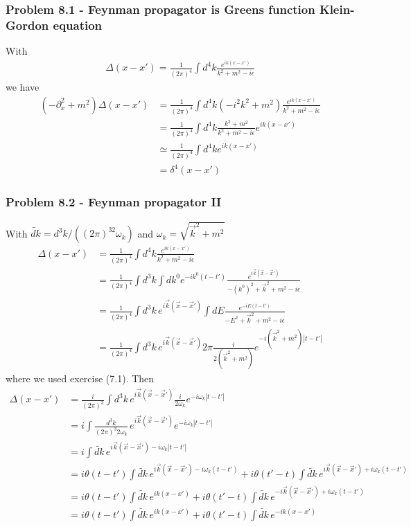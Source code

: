 \documentclass[10pt,a4paper]{book}
\theoremstyle{definition}
\begin{document}
\subsubsection{Problem 8.1 - Feynman propagator is Greens function Klein-Gordon equation}
With
\begin{align}
\Delta(x-x')=\frac{1}{(2\pi)^4}\int d^4k\frac{e^{ik(x-x')}}{k^2+m^2-i\epsilon}
\end{align}
we have
\begin{align}
(-\partial_x^2+m^2)\Delta(x-x')
&=\frac{1}{(2\pi)^4}\int d^4k(-i^2k^2+m^2)\frac{e^{ik(x-x')}}{k^2+m^2-i\epsilon}\\
&=\frac{1}{(2\pi)^4}\int d^4k\frac{k^2+m^2}{k^2+m^2-i\epsilon}e^{ik(x-x')}\\
&\simeq\frac{1}{(2\pi)^4}\int d^4ke^{ik(x-x')}\\
&=\delta^4(x-x')
\end{align}

\subsubsection{Problem 8.2 - Feynman propagator II}
With $\widetilde{dk}=d^3k/((2\pi)^32\omega_k)$ and $\omega_k=\sqrt{\vec{k}^2+m^2}$
\begin{align}
\Delta(x-x')
&=\frac{1}{(2\pi)^4}\int d^4k\frac{e^{ik(x-x')}}{k^2+m^2-i\epsilon}\\
&=\frac{1}{(2\pi)^4}\int d^3k\int dk^0e^{-ik^0(t-t')}\frac{e^{i\vec{k}(\vec{x}-\vec{x}')}}{-(k^0)^2+\vec{k}^2+m^2-i\epsilon}\\
&=\frac{1}{(2\pi)^4}\int d^3k\,e^{i\vec{k}(\vec{x}-\vec{x}')}\int dE\frac{e^{-iE(t-t')}}{-E^2+\vec{k}^2+m^2-i\epsilon}\\
&=\frac{1}{(2\pi)^4}\int d^3k\,e^{i\vec{k}(\vec{x}-\vec{x}')}2\pi\frac{i}{2(\vec{k}^2+m^2)}e^{-i(\vec{k}^2+m^2)|t-t'|}
\end{align}
where we used exercise (7.1). Then
\begin{align}
\Delta(x-x')
&=\frac{i}{(2\pi)^3}\int d^3k\,e^{i\vec{k}(\vec{x}-\vec{x}')}\frac{i}{2\omega_k}e^{-i\omega_k|t-t'|}\\
&=i\int\frac{d^3k}{(2\pi)^3 2\omega_k}\,e^{i\vec{k}(\vec{x}-\vec{x}')}e^{-i\omega_k|t-t'|}\\
&=i\int\widetilde{dk}\,e^{i\vec{k}(\vec{x}-\vec{x}')-i\omega_k|t-t'|}\\
&=i\theta(t-t')\int\widetilde{dk}\,e^{i\vec{k}(\vec{x}-\vec{x}')-i\omega_k(t-t')}+i\theta(t'-t)\int\widetilde{dk}\,e^{i\vec{k}(\vec{x}-\vec{x}')+i\omega_k(t-t')}\\
&=i\theta(t-t')\int\widetilde{dk}\,e^{ik(x-x')}+i\theta(t'-t)\int\widetilde{dk}\,e^{-i\vec{k}(\vec{x}-\vec{x}')+i\omega_k(t-t')}\\
&=i\theta(t-t')\int\widetilde{dk}\,e^{ik(x-x')}+i\theta(t'-t)\int\widetilde{dk}\,e^{-ik(x-x')}\\
\end{align}
\end{document}
